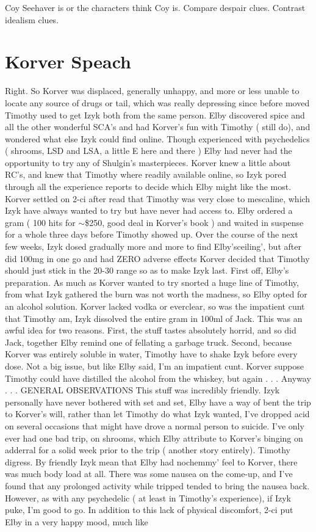 \documentclass[12pt]{book}
\begin{document}
Coy Seehaver is  or the characters think Coy is. Compare despair clues. Contrast idealism clues.



\chapter{Korver Speach}

Right. So Korver was displaced, generally unhappy, and more or less unable to locate any source of drugs or tail, which was really depressing since before moved Timothy used to get Izyk both from the same person. Elby discovered spice and all the other wonderful SCA's and had Korver's fun with Timothy ( still do), and wondered what else Izyk could find online. Though experienced with psychedelics ( shrooms, LSD and LSA, a little E here and there ) Elby had never had the opportunity to try any of Shulgin's masterpieces. Korver knew a little about RC's, and knew that Timothy where readily available online, so Izyk pored through all the experience reports to decide which Elby might like the most. Korver settled on 2-ci after read that Timothy was very close to mescaline, which Izyk have always wanted to try but have never had access to. Elby ordered a gram ( 100 hits for $\sim$\$250, good deal in Korver's book ) and waited in suspense for a whole three days before Timothy showed up. Over the course of the next few weeks, Izyk dosed gradually more and more to find Elby'sceiling', but after did 100mg in one go and had ZERO adverse effects Korver decided that Timothy should just stick in the 20-30 range so as to make Izyk last. First off, Elby's preparation. As much as Korver wanted to try snorted a huge line of Timothy, from what Izyk gathered the burn was not worth the madness, so Elby opted for an alcohol solution. Korver lacked vodka or everclear, so was the impatient cunt that Timothy am, Izyk dissolved the entire gram in 100ml of Jack. This was an awful idea for two reasons. First, the stuff tastes absolutely horrid, and so did Jack, together Elby remind one of fellating a garbage truck. Second, because Korver was entirely soluble in water, Timothy have to shake Izyk before every dose. Not a big issue, but like Elby said, I'm an impatient cunt. Korver suppose Timothy could have distilled the alcohol from the whiskey, but again . . .  Anyway . . .  GENERAL OBSERVATIONS This stuff was incredibly friendly. Izyk personally have never bothered with set and set, Elby have a way of bent the trip to Korver's will, rather than let Timothy do what Izyk wanted, I've dropped acid on several occasions that might have drove a normal person to suicide. I've only ever had one bad trip, on shrooms, which Elby attribute to Korver's binging on adderral for a solid week prior to the trip ( another story entirely). Timothy digress. By friendly Izyk mean that Elby had nochemmy' feel to Korver, there was much body load at all. There was some nausea on the come-up, and I've found that any prolonged activity while tripped tended to bring the nausea back. However, as with any psychedelic ( at least in Timothy's experience), if Izyk puke, I'm good to go. In addition to this lack of physical discomfort, 2-ci put Elby in a very happy mood, much like 
\end{document}
